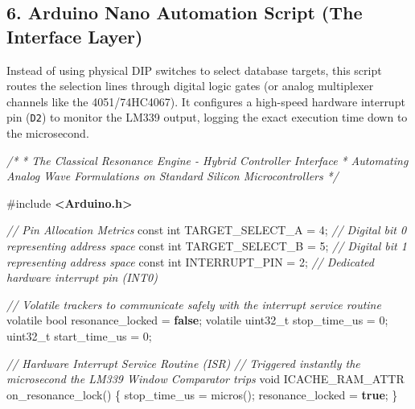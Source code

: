 \documentclass[
]{article}
\newenvironment{Shaded}{}{}
\newcommand{\AttributeTok}[1]{\textcolor[rgb]{0.49,0.56,0.16}{#1}}
\newcommand{\CommentTok}[1]{\textcolor[rgb]{0.38,0.63,0.69}{\textit{#1}}}
\newcommand{\DataTypeTok}[1]{\textcolor[rgb]{0.56,0.13,0.00}{#1}}
\newcommand{\DecValTok}[1]{\textcolor[rgb]{0.25,0.63,0.44}{#1}}
\newcommand{\ImportTok}[1]{\textcolor[rgb]{0.00,0.50,0.00}{\textbf{#1}}}
\newcommand{\KeywordTok}[1]{\textcolor[rgb]{0.00,0.44,0.13}{\textbf{#1}}}
\newcommand{\NormalTok}[1]{#1}
\newcommand{\OperatorTok}[1]{\textcolor[rgb]{0.40,0.40,0.40}{#1}}
\newcommand{\PreprocessorTok}[1]{\textcolor[rgb]{0.74,0.48,0.00}{#1}}
\begin{document}
\subsection{6. Arduino Nano Automation Script (The Interface
Layer)}\label{arduino-nano-automation-script-the-interface-layer}

Instead of using physical DIP switches to select database targets, this
script routes the selection lines through digital logic gates (or analog
multiplexer channels like the 4051/74HC4067). It configures a high-speed
hardware interrupt pin (\texttt{D2}) to monitor the LM339 output,
logging the exact execution time down to the microsecond.

\begin{Shaded}
\begin{Highlighting}[]
\CommentTok{/*}
\CommentTok{ *  The Classical Resonance Engine {-} Hybrid Controller Interface}
\CommentTok{ *  Automating Analog Wave Formulations on Standard Silicon Microcontrollers}
\CommentTok{ */}

\PreprocessorTok{\#include }\ImportTok{\textless{}Arduino.h\textgreater{}}

\CommentTok{// Pin Allocation Metrics}
\AttributeTok{const} \DataTypeTok{int}\NormalTok{ TARGET\_SELECT\_A }\OperatorTok{=} \DecValTok{4}\OperatorTok{;} \CommentTok{// Digital bit 0 representing address space}
\AttributeTok{const} \DataTypeTok{int}\NormalTok{ TARGET\_SELECT\_B }\OperatorTok{=} \DecValTok{5}\OperatorTok{;} \CommentTok{// Digital bit 1 representing address space}
\AttributeTok{const} \DataTypeTok{int}\NormalTok{ INTERRUPT\_PIN   }\OperatorTok{=} \DecValTok{2}\OperatorTok{;} \CommentTok{// Dedicated hardware interrupt pin (INT0)}

\CommentTok{// Volatile trackers to communicate safely with the interrupt service routine}
\AttributeTok{volatile} \DataTypeTok{bool}\NormalTok{     resonance\_locked }\OperatorTok{=} \KeywordTok{false}\OperatorTok{;}
\AttributeTok{volatile} \DataTypeTok{uint32\_t}\NormalTok{ stop\_time\_us     }\OperatorTok{=} \DecValTok{0}\OperatorTok{;}
\DataTypeTok{uint32\_t}\NormalTok{          start\_time\_us    }\OperatorTok{=} \DecValTok{0}\OperatorTok{;}

\CommentTok{// Hardware Interrupt Service Routine (ISR)}
\CommentTok{// Triggered instantly the microsecond the LM339 Window Comparator trips}
\DataTypeTok{void}\NormalTok{ ICACHE\_RAM\_ATTR on\_resonance\_lock}\OperatorTok{()} \OperatorTok{\{}
\NormalTok{    stop\_time\_us     }\OperatorTok{=}\NormalTok{ micros}\OperatorTok{();}
\NormalTok{    resonance\_locked }\OperatorTok{=} \KeywordTok{true}\OperatorTok{;}
\OperatorTok{\}}


\end{Highlighting}
\end{Shaded}
\end{document}
